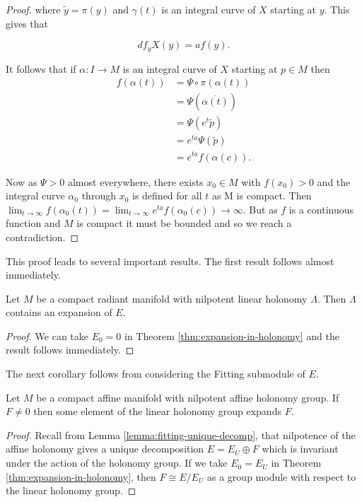 \begin{proof}
    where $\tilde{y} = \pi(y)$ and $\gamma(t)$ is an integral curve of $X$ starting
    at $y$. This gives that

    \[df_y X(y) = af(y).\]

    It follows that if $\alpha: I \to M$ is an integral curve of $X$ starting at $p
        \in M$ then
    \begin{align*}
        f(\alpha(t)) & = \Psi\circ \pi (\alpha(t))  \\
                     & = \Psi(\overline{\alpha(t)}) \\
                     & = \Psi(e^t \tilde{p})        \\
                     & = e^{ta}\Psi(\tilde{p})      \\
                     & = e^{ta}f(\alpha(c)).
    \end{align*}

    Now as $\Psi > 0$ almost everywhere, there exists $x_0 \in M$ with $f(x_0)>0$
    and the integral curve $\alpha_0$ through $x_0$ is defined for all $t$ as M is
    compact. Then $\lim_{t \to \infty}f(\alpha_0 (t)) = \lim_{t \to \infty}
        e^{ta}f(\alpha_0(c)) \to \infty$. But as $f$ is a continuous function and $M$
    is compact it must be bounded and so we reach a contradiction.
\end{proof}

This proof leads to several important results. The first result follows almost
immediately.

\begin{corollary}\label{corr:radiant-expansion}
    Let $M$ be a compact radiant manifold with nilpotent linear holonomy $\Lambda$. Then $\Lambda$ contains an expansion of $E$.
\end{corollary}
\begin{proof}
    We can take $E_0 = 0$ in Theorem \ref{thm:expansion-in-holonomy} and the result follows immediately.
\end{proof}

The next corollary follows from considering the Fitting submodule of $E$.

\begin{corollary}
    Let $M$ be a compact affine manifold with nilpotent affine holonomy group. If $F \neq 0$ then some element of the linear holonomy group
    expands $F$.
    \label{corr:F-has-expansion}
\end{corollary}
\begin{proof}
    Recall from Lemma \ref{lemma:fitting-unique-decomp}, that nilpotence of the affine holonomy gives a unique decomposition
    $E = E_U \oplus F$ which is invariant under the action of the holonomy group. If we take $E_0 = E_U$ in Theorem \ref{thm:expansion-in-holonomy},
    then $F \cong E/E_U$ as a group module with respect to the linear holonomy group.
\end{proof}

